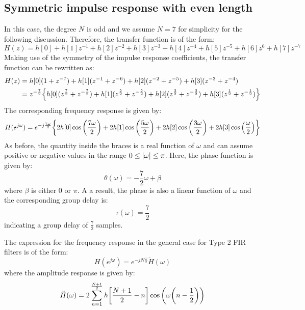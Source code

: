 \documentclass[../../main/main.tex]{subfiles}
\begin{document}
\subsection{Symmetric impulse response with even length}
In this case, the degree \( N \) is odd and we assume \( N = 7 \) for simplicity for the following discussion. Therefore, the transfer function is of the form:
\begin{equation}
    H(z)
    =
    h[0] + h[1]z^{-1} + h[2]z^{-2} + h[3]z^{-3} + h[4]z^{-4} + h[5]z^{-5} + h[6]z^{6} + h[7]z^{-7}
    \label{eq:L20_S23_1}
\end{equation}
Making use of the symmetry of the impulse response coefficients, the transfer function can be rewritten as:
\begin{align}
    H(z)
    &=
        h[0](1 + z^{-7}) + h[1](z^{-1} + z^{-6}) + h[2](z^{-2} + z^{-5}) + h[3](z^{-3} + z^{-4})   \nonumber   \\
    &=
        z^{-\frac{7}{2}} \qty{h[0](z^{\frac{7}{2}} + z^{-\frac{7}{2}}) + h[1](z^{\frac{5}{2}} + z^{-\frac{5}{2}}) + h[2](z^{\frac{3}{2}} + z^{-\frac{3}{2}}) + h[3](z^{\frac{1}{2}} + z^{-\frac{1}{2}})}
\end{align}
The corresponding frequency response is given by:
\begin{equation}
    H(e^{j\omega})
    =
    e^{-j\frac{7\omega}{2}} \qty{2h[0]\cos\qty(\frac{7\omega}{2}) + 2h[1]\cos\qty(\frac{5\omega}{2}) + 2h[2]\cos\qty(\frac{3\omega}{2}) + 2h[3]\cos\qty(\frac{\omega}{2})}
    \label{eq:L20_S25_1}
\end{equation}
As before, the quantity inside the braces is a real function of \( \omega \) and can assume positive or negative values in the range \( 0 \le \abs{\omega} \le \pi \). Here, the phase function is given by:
\begin{equation}
    \theta(\omega)
    =
    - \frac{7}{2} \omega + \beta
    \label{eq:L20_S26_1}
\end{equation}
where \( \beta \) is either \( 0 \) or \( \pi \). A a result, the phase is also a linear function of \( \omega \) and the corresponding group delay is:
\begin{equation}
    \tau(\omega)
    =
    \frac{7}{2}
    \label{eq:L20_S26_2}
\end{equation}
indicating a group delay of \( \frac{7}{2} \) samples.

The expression for the frequency response in the general case for Type 2 FIR filters is of the form:
\begin{equation}
    H(e^{j\omega})
    =
    e^{-jN \frac{\omega}{2}} \breve{H}(\omega)
    \label{eq:L20_S27_1}
\end{equation}
where the amplitude response is given by:
\begin{equation}
    \breve{H}(\omega)
    =
    2 \sum_{n=1}^{\frac{N+1}{2}} h\qty[\frac{N+1}{2} - n] \cos\qty(\omega \qty(n - \frac{1}{2}))
    \label{eq:L20_S27_2}
\end{equation}
\end{document}
